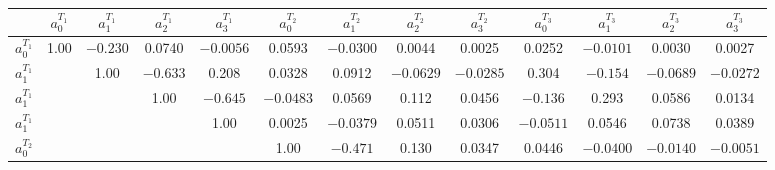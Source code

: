 \documentclass[aps,superscriptaddress,showpacs,nofootinbib,11pt]{revtex4-1}
\newcommand\tstrut{\rule{0pt}{2.9ex}}       %
\begin{document}
%
\begin{table}[h]
\begin{ruledtabular}
\begin{center}
\begin{tabular}{ccccccccccccc}
 & $a_0^{{T_1}}$&$a_1^{{T_1}}$&$a_2^{{T_1}}$&$a_3^{{T_1}}$
& $a_0^{{T_2}}$&$a_1^{{T_2}}$&$a_2^{{T_2}}$&$a_3^{{T_2}}$& $a_0^{{T_3}}$&$a_1^{{T_3}}$&$a_2^{{T_3}}$&$a_3^{{T_3}}$\\ \hline \tstrut
$a_0^{{T_1}}$&1.00&  $-0.230$&   \hspace{.25cm}0.0740  &$-0.0056$ &  \hspace{.25cm}0.0593 & $-0.0300$ & \hspace{.25cm}0.0044 &  \hspace{.25cm}0.0025  & \hspace{.25cm}0.0252 &$-0.0101$ &  \hspace{.25cm}0.0030 &  \hspace{.25cm}0.0027\\
$a_1^{{T_1}}$&&  1.00 &$-0.633$&  \hspace{.25cm}0.208 &  \hspace{.25cm}0.0328  & \hspace{.25cm}0.0912 & $-0.0629$ & $-0.0285$ &  \hspace{.25cm}0.304&  $-0.154$ & $-0.0689$ & $-0.0272$\\
$a_1^{{T_1}}$&&&1.00&  $-0.645$&  $-0.0483$&  \hspace{.25cm}0.0569 &  \hspace{.25cm}0.112 &  \hspace{.25cm}0.0456&  $-0.136$&   \hspace{.25cm}0.293&   \hspace{.25cm}0.0586 &  \hspace{.25cm}0.0134\\
$a_1^{{T_1}}$&&&&1.00&   0.0025 & $-0.0379$&   \hspace{.25cm}0.0511&   \hspace{.25cm}0.0306 & $-0.0511$&   \hspace{.25cm}0.0546 &  \hspace{.25cm}0.0738&   \hspace{.25cm}0.0389\\
$a_0^{{T_2}}$&&&&&1.00&  $-0.471$&   \hspace{.25cm}0.130&   \hspace{.25cm}0.0347 &  \hspace{.25cm}0.0446&  $-0.0400$&  $-0.0140$&  $-0.0051$\\

\end{tabular}
\end{center}
\end{ruledtabular}
\end{table}
\end{document}
